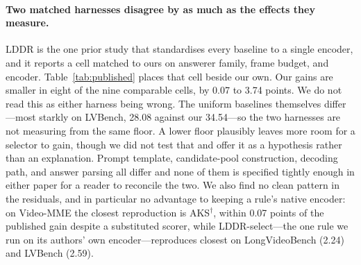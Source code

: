 \documentclass[11pt]{article}
\begin{document}
\paragraph{Two matched harnesses disagree by as much as the effects they measure.}
LDDR is the one prior study that standardises every baseline to a single encoder, and it reports a cell matched to ours on answerer family, frame budget, and encoder.
Table~\ref{tab:published} places that cell beside our own.
Our gains are smaller in eight of the nine comparable cells, by 0.07 to 3.74 points.
We do not read this as either harness being wrong.
The uniform baselines themselves differ---most starkly on LVBench, 28.08 against our 34.54---so the two harnesses are not measuring from the same floor. A lower floor plausibly leaves more room for a selector to gain, though we did not test that and offer it as a hypothesis rather than an explanation.
Prompt template, candidate-pool construction, decoding path, and answer parsing all differ and none of them is specified tightly enough in either paper for a reader to reconcile the two.
We also find no clean pattern in the residuals, and in particular no advantage to keeping a rule's native encoder: on Video-MME the closest reproduction is AKS$^\dagger$, within 0.07 points of the published gain despite a substituted scorer, while LDDR-select---the one rule we run on its authors' own encoder---reproduces closest on LongVideoBench (2.24) and LVBench (2.59).
\end{document}
